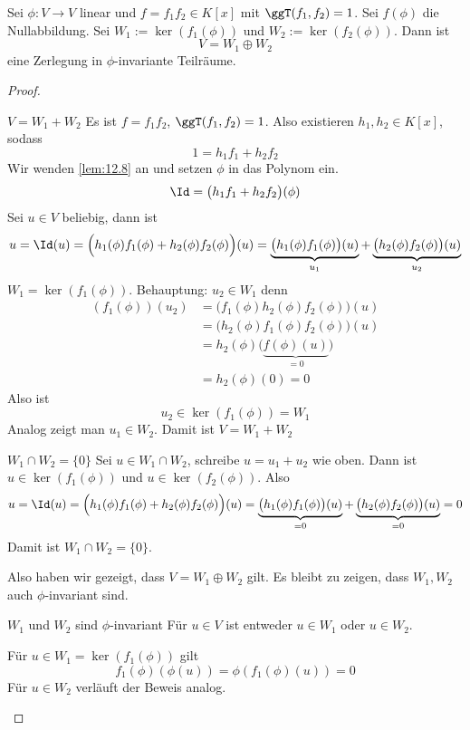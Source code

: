 \documentclass{mycourse}
\begin{document}
\begin{lem}
\label{lem:12.9}
Sei $\phi: V\to V$ linear und $f=f_1f_2\in K[x]$ mit $\ggT(f_1,f_2)=1$.
Sei $f(\phi)$ die Nullabbildung.
Sei $W_1:=\ker(f_1(\phi))$ und $W_2:=\ker(f_2(\phi))$.
Dann ist
\[
V=W_1\oplus W_2
\]
eine Zerlegung in $\phi$-invariante Teilräume.

\begin{proof}
	\begin{seg}{$V=W_1+W_2$}
Es ist $f=f_1f_2$, $\ggT(f_1,f_2)= 1$.
Also existieren $h_1,h_2\in K[x]$, sodass
\[
1=h_1f_1+h_2f_2
\]
Wir wenden \ref{lem:12.8} an und setzen $\phi$ in das Polynom ein.
\[
	\Id=\big(h_1f_1+h_2f_2\big)(\phi)
\]
Sei $u\in V$ beliebig, dann ist
\[
	u= \Id(u) = \Big(h_1(\phi)f_1(\phi) + h_2(\phi)f_2(\phi)\Big)(u) = \underbrace{\big(h_1(\phi)f_1(\phi)\big)(u)}_{u_1} + \underbrace{\big(h_2(\phi)f_2(\phi)\big)(u)}_{u_2} 
\]
$W_1=\ker(f_1(\phi))$. Behauptung: $u_2\in W_1$ denn
\begin{align*}
(f_1(\phi))(u_2) &= \big(f_1(\phi)h_2(\phi)f_2(\phi)\big)(u) \\
&= \big(h_2(\phi)f_1(\phi)f_2(\phi)\big)(u)\\
&= h_2(\phi)\big(\underbrace{f(\phi)(u)}_{=0}\big)\\
&= h_2(\phi)(0) = 0
\end{align*}
Also ist
\[
u_2\in \ker(f_1(\phi)) = W_1
\]
Analog zeigt man $u_1\in W_2$.
Damit ist $V=W_1+W_2$
\end{seg}
\begin{seg}{$W_1\cap W_2 =\{0\}$}
Sei $u\in W_1\cap W_2$, schreibe $u=u_1+u_2$ wie oben.
Dann ist $u\in \ker(f_1(\phi))$ und $u\in \ker(f_2(\phi))$.
Also
\[
	u= \Id(u) = \Big(h_1(\phi)f_1(\phi) + h_2(\phi)f_2(\phi)\Big)(u) = \underbrace{\big(h_1(\phi)f_1(\phi)\big)(u)}_{=0} + \underbrace{\big(h_2(\phi)f_2(\phi)\big)(u)}_{=0}  =0
\]
Damit ist $W_1\cap W_2 = \{0\}$.
\end{seg}
Also haben wir gezeigt, dass $V=W_1\oplus W_2$ gilt.
Es bleibt zu zeigen, dass $W_1,W_2$ auch $\phi$-invariant sind.

\begin{seg}{$W_1$ und $W_2$ sind $\phi$-invariant}
	Für $u\in V$ ist entweder $u\in W_1$ oder $u\in W_2$.

Für $u\in W_1=\ker(f_1(\phi))$ gilt
\[
f_1(\phi)(\phi(u)) = \phi(f_1(\phi)(u)) = 0
\]
Für $u\in W_2$ verläuft der Beweis analog.
\end{seg}
\end{proof}

\end{lem}
\end{document}
